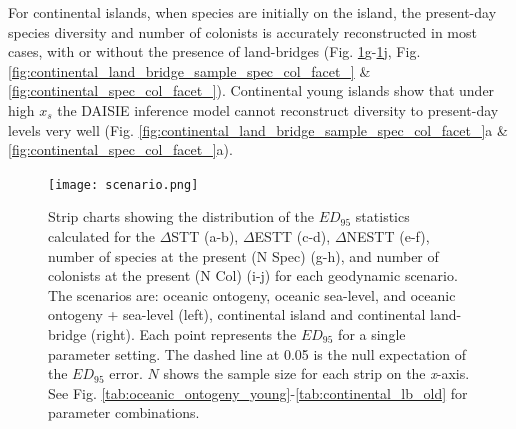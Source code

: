 \documentclass{article}
\begin{document}
For continental islands, when species are initially on the island, the present-day species diversity and number of colonists is accurately reconstructed in most cases, with or without the presence of land-bridges (Fig. \ref{fig:scenario}g-\ref{fig:scenario}j, Fig.  \ref{fig:continental_land_bridge_sample_spec_col_facet_} \& \ref{fig:continental_spec_col_facet_}). Continental young islands show that under high $x_s$ the DAISIE inference model cannot reconstruct diversity to present-day levels very well (Fig. \ref{fig:continental_land_bridge_sample_spec_col_facet_}a \& \ref{fig:continental_spec_col_facet_}a).

\clearpage

\begin{figure}
    \centering
    \texttt{[image: scenario.png]}
    \caption{Strip charts showing the distribution of the $ED_{95}$ statistics calculated for the $\Delta$STT (a-b), $\Delta$ESTT (c-d), $\Delta$NESTT (e-f), number of species at the present (N Spec) (g-h), and number of colonists at the present (N Col) (i-j) for each geodynamic scenario. The scenarios are: oceanic ontogeny, oceanic sea-level, and oceanic ontogeny + sea-level (left), continental island and continental land-bridge (right). Each point represents the $ED_{95}$ for a single parameter setting. The dashed line at 0.05 is the null expectation of the $ED_{95}$ error. $N$ shows the sample size for each strip on the \textit{x}-axis. See Fig. \ref{tab:oceanic_ontogeny_young}-\ref{tab:continental_lb_old} for parameter combinations.}
    \label{fig:scenario}
\end{figure}

\clearpage
\end{document}
